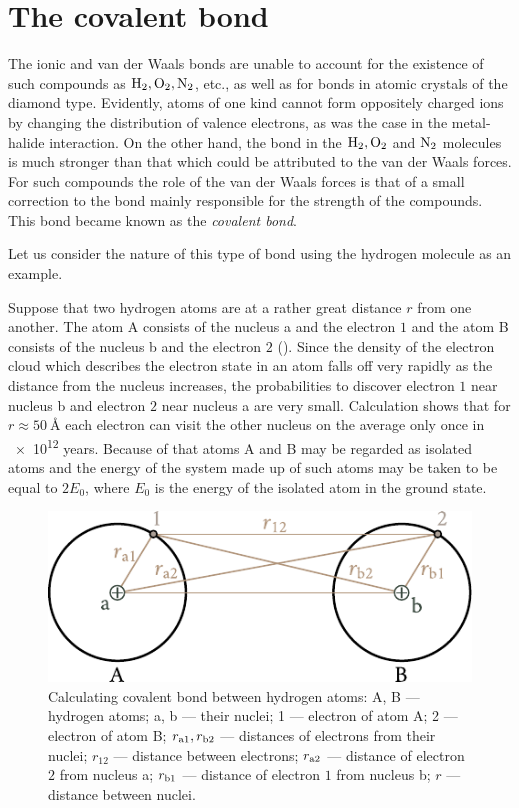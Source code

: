 \section{The covalent bond}\label{sec:3}

The ionic and van der Waals bonds are unable to account for the existence of such compounds as $\ce{H2}, \ce{O2}, \ce{N2}$, etc., as well as for bonds in atomic crystals of the diamond type. Evidently, atoms of one kind cannot form oppositely charged ions by changing the distribution of valence electrons, as was the case in the metal-halide interaction. On the other hand, the bond in the $\ce{H2}, \ce{O2}$ and $\ce{N2}$ molecules is much stronger than that which could be attributed to the van der Waals forces. For such compounds the role of the van der Waals forces is that of a small correction to the bond mainly responsible for the strength of the compounds. This bond became known as the \textit{covalent bond}.

Let us consider the nature of this type of bond using the hydrogen molecule as an example.

Suppose that two hydrogen atoms are at a rather great distance $r$ from one another. The atom A consists of the nucleus a and the electron $1$ and the atom B consists of the nucleus b and the electron $2$ (). Since the density of the electron cloud which describes the electron state in an atom falls off very rapidly as the distance from the nucleus increases, the probabilities to discover electron $1$ near nucleus b and electron $2$ near nucleus a are very small. Calculation shows that for $r\approx\SI{50}{\angstrom}$ each electron can visit the other nucleus on the average only once in \num{e12} years. Because of that atoms A and B may be regarded as isolated atoms and the energy of the system made up of such atoms may be taken to be equal to $2E_0$, where $E_0$ is the energy of the isolated atom in the ground state.

\begin{figure}[t]
	\begin{center}
		\includegraphics[scale=1]{figures/ch_01/fig_1_5.pdf}
		\caption[]{Calculating covalent bond between hydrogen atoms: A, B --- hydrogen atoms; a, b --- their nuclei; 1 --- electron of atom A; 2 --- electron of atom B; $r_{\text{a$1$}}, r_{\text{b$2$}}$ --- distances of electrons from their nuclei; $r_{12}$ --- distance between electrons; $r_{\text{a$2$}}$ --- distance of electron $2$ from nucleus a; $r_{\text{b$1$}}$ --- distance of electron $1$ from nucleus b; $r$ --- distance between nuclei.}
		\label{fig:1_5}
	\end{center}
	\vspace{-0.7cm}
\end{figure}

